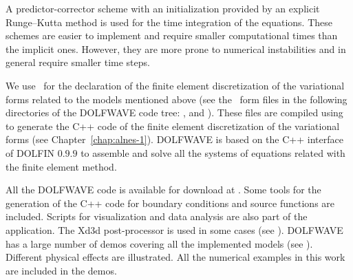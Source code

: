 A predictor-corrector scheme with an initialization
provided by an explicit Runge--Kutta method is used for the
time integration of the equations.
These schemes are easier to implement and require smaller
computational times than the implicit ones.
However, they are more prone to numerical instabilities
and in general require smaller time steps.

We use \ufl\ for the declaration of the finite element discretization
of the variational forms related to the models mentioned above (see
the \ufl\ form files in the following directories of the DOLFWAVE code
tree: , 
and ).  These files are compiled using \ffc
to generate the C++ code of the finite element discretization of the
variational forms (see Chapter~\ref{chap:alnes-1}).  DOLFWAVE is based
on the C++ interface of DOLFIN $0.9.9$ to assemble and solve all the
systems of equations related with the finite element method.

All the DOLFWAVE code is available for download
at . Some tools for the generation
of the C++ code for boundary conditions and source functions are
included. Scripts for visualization and data analysis are also part of
the application. The Xd3d post-processor is used in some cases
(see ).
DOLFWAVE has a large number of demos covering all the implemented
models (see ). Different physical effects are
illustrated.  All the numerical examples in this work are included in
the demos.

